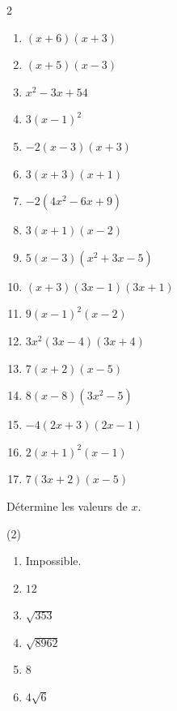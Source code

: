 \documentclass[a4paper, 12pt, parskip=half-]{scrartcl}
\begin{document}
\begin{solution}
\begin{multicols}{2}
\begin{enumerate}
        \item $(x+6)(x+3)$
        \item $(x+5)(x-3)$
        \item $x^2 - 3x + 54$
        \item $3(x-1)^2$ 
        \item $-2(x-3)(x+3)$
        \item $3(x+3)(x+1)$
        \item $-2\left(4x^2 - 6x + 9\right)$
        \item $3(x+1)(x-2)$
        \item $5(x-3)(x^2+3x-5)$
        \item $(x+3)(3x-1)(3x+1)$
        \item $9(x-1)^2(x-2)$
        \item $3x^2(3x-4)(3x+4)$
        \item $7(x+2)(x-5)$
        \item $8(x-8)\left(3x^2 - 5\right)$
        \item $-4(2x+3)(2x-1)$
        \item $2(x+1)^2(x-1)$
        \item $7(3x+2)(x-5)$               
    \end{enumerate}
\end{multicols}
\end{solution}
\newpage
\begin{exercise}
    Détermine les valeurs de $x$.
    \begin{tasks}[after-item-skip=\fill](2)
        \task 
        \task 
        \task 
        \task 
        \task 
        \task 
    \end{tasks}
\end{exercise}
\begin{solution}
    \begin{enumerate}
        \item Impossible.
        \item $12$
        \item $\sqrt{353}$
        \item $\sqrt{8962}$
        \item $8$
        \item $4\sqrt{6}$
    \end{enumerate}
\end{solution}
\end{document}
